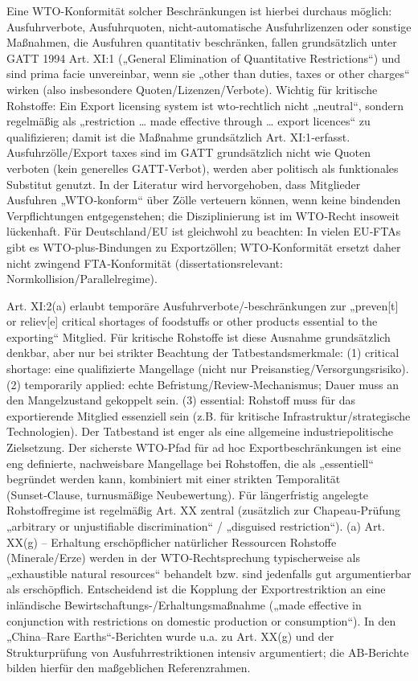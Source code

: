 \documentclass[12pt,a4paper,oneside]{book} %
\begin{document}
Eine WTO-Konformität solcher Beschränkungen ist hierbei durchaus möglich: Ausfuhrverbote, Ausfuhrquoten, nicht‑automatische Ausfuhrlizenzen oder sonstige Maßnahmen, die Ausfuhren quantitativ beschränken, fallen grundsätzlich unter GATT 1994 Art. XI:1 („General Elimination of Quantitative Restrictions“) und sind prima facie unvereinbar, wenn sie „other than duties, taxes or other charges“ wirken (also insbesondere Quoten/Lizenzen/Verbote). Wichtig für kritische Rohstoffe: Ein Export licensing system ist wto-rechtlich nicht „neutral“, sondern regelmäßig als „restriction … made effective through … export licences“ zu qualifizieren; damit ist die Maßnahme grundsätzlich Art. XI:1‑erfasst. Ausfuhrzölle/Export taxes sind im GATT grundsätzlich nicht wie Quoten verboten (kein generelles GATT‑Verbot), werden aber politisch als funktionales Substitut genutzt. In der Literatur wird hervorgehoben, dass Mitglieder Ausfuhren „WTO‑konform“ über Zölle verteuern können, wenn keine bindenden Verpflichtungen entgegenstehen; die Disziplinierung ist im WTO‑Recht insoweit lückenhaft. 
Für Deutschland/EU ist gleichwohl zu beachten: In vielen EU‑FTAs gibt es WTO‑plus‑Bindungen zu Exportzöllen; WTO‑Konformität ersetzt daher nicht zwingend FTA‑Konformität (dissertationsrelevant: Normkollision/Parallelregime).

Art. XI:2(a) erlaubt temporäre Ausfuhrverbote/-beschränkungen zur „preven[t] or reliev[e] critical shortages of foodstuffs or other products essential to the exporting“ Mitglied. 
Für kritische Rohstoffe ist diese Ausnahme grundsätzlich denkbar, aber nur bei strikter Beachtung der Tatbestandsmerkmale: (1) critical shortage: eine qualifizierte Mangellage (nicht nur Preisanstieg/Versorgungsrisiko). 
(2) temporarily applied: echte Befristung/Review‑Mechanismus; Dauer muss an den Mangelzustand gekoppelt sein. 
(3) essential: Rohstoff muss für das exportierende Mitglied essenziell sein (z.B. für kritische Infrastruktur/strategische Technologien). Der Tatbestand ist enger als eine allgemeine industriepolitische Zielsetzung. Der sicherste WTO‑Pfad für ad hoc Exportbeschränkungen ist eine eng definierte, nachweisbare Mangellage bei Rohstoffen, die als „essentiell“ begründet werden kann, kombiniert mit einer strikten Temporalität (Sunset‑Clause, turnusmäßige Neubewertung).
Für längerfristig angelegte Rohstoffregime ist regelmäßig Art. XX zentral (zusätzlich zur Chapeau‑Prüfung „arbitrary or unjustifiable discrimination“ / „disguised restriction“).
(a) Art. XX(g) – Erhaltung erschöpflicher natürlicher Ressourcen
Rohstoffe (Minerale/Erze) werden in der WTO‑Rechtsprechung typischerweise als „exhaustible natural resources“ behandelt bzw. sind jedenfalls gut argumentierbar als erschöpflich. Entscheidend ist die Kopplung der Exportrestriktion an eine inländische Bewirtschaftungs-/Erhaltungsmaßnahme („made effective in conjunction with restrictions on domestic production or consumption“). In den „China–Rare Earths“-Berichten wurde u.a. zu Art. XX(g) und der Strukturprüfung von Ausfuhrrestriktionen intensiv argumentiert; die AB‑Berichte bilden hierfür den maßgeblichen Referenzrahmen.
\end{document}
